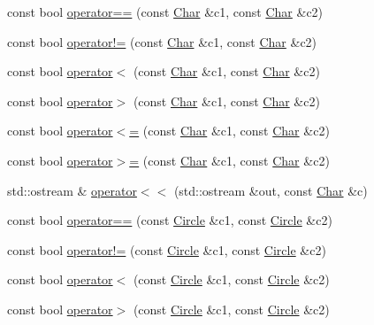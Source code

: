 \begin{DoxyCompactItemize}
\item 
const bool \hyperlink{namespaceprism_a1ba68b64a6cfdcff9e144b8c2476cddb}{operator==} (const \hyperlink{classprism_1_1_char}{Char} \&c1, const \hyperlink{classprism_1_1_char}{Char} \&c2)
\item 
const bool \hyperlink{namespaceprism_a249b6933154570d808cdd405ab1fd89b}{operator!=} (const \hyperlink{classprism_1_1_char}{Char} \&c1, const \hyperlink{classprism_1_1_char}{Char} \&c2)
\item 
const bool \hyperlink{namespaceprism_a2fc3e64ba36a16f24cb0ae387c83f35f}{operator$<$} (const \hyperlink{classprism_1_1_char}{Char} \&c1, const \hyperlink{classprism_1_1_char}{Char} \&c2)
\item 
const bool \hyperlink{namespaceprism_ab8a312729c4c9ae72836d0034a6f0758}{operator$>$} (const \hyperlink{classprism_1_1_char}{Char} \&c1, const \hyperlink{classprism_1_1_char}{Char} \&c2)
\item 
const bool \hyperlink{namespaceprism_a87d86e9266469c8a40537e12a560b066}{operator$<$=} (const \hyperlink{classprism_1_1_char}{Char} \&c1, const \hyperlink{classprism_1_1_char}{Char} \&c2)
\item 
const bool \hyperlink{namespaceprism_aad049ddef9beb3fec3e7057a7f651280}{operator$>$=} (const \hyperlink{classprism_1_1_char}{Char} \&c1, const \hyperlink{classprism_1_1_char}{Char} \&c2)
\item 
std\+::ostream \& \hyperlink{namespaceprism_aa67ea1154a35dabe9c2c232aff65e930}{operator$<$$<$} (std\+::ostream \&out, const \hyperlink{classprism_1_1_char}{Char} \&c)
\item 
const bool \hyperlink{namespaceprism_a0ce1ad6e6392618212d5ab3bebb8e585}{operator==} (const \hyperlink{classprism_1_1_circle}{Circle} \&c1, const \hyperlink{classprism_1_1_circle}{Circle} \&c2)
\item 
const bool \hyperlink{namespaceprism_a58cbf7ef406800002b446a0f1e917745}{operator!=} (const \hyperlink{classprism_1_1_circle}{Circle} \&c1, const \hyperlink{classprism_1_1_circle}{Circle} \&c2)
\item 
const bool \hyperlink{namespaceprism_a8e662d15b162ca76912c491798caefd3}{operator$<$} (const \hyperlink{classprism_1_1_circle}{Circle} \&c1, const \hyperlink{classprism_1_1_circle}{Circle} \&c2)
\item 
const bool \hyperlink{namespaceprism_a671739ac8567654dba563c34af92213f}{operator$>$} (const \hyperlink{classprism_1_1_circle}{Circle} \&c1, const \hyperlink{classprism_1_1_circle}{Circle} \&c2)
\item 

\end{DoxyCompactItemize}
